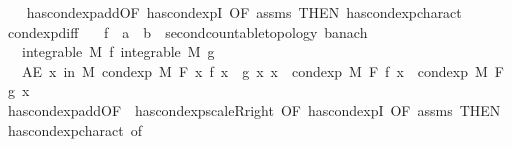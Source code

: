 \begin{isabellebody}
%
\isadelimproof
\ \ %
\endisadelimproof
%
\isatagproof
{}\isamarkupfalse%
\ has{\isacharunderscore}{\kern0pt}cond{\isacharunderscore}{\kern0pt}exp{\isacharunderscore}{\kern0pt}add{\isacharbrackleft}{\kern0pt}OF\ has{\isacharunderscore}{\kern0pt}cond{\isacharunderscore}{\kern0pt}expI{\isacharparenleft}{\kern0pt}{}{\isacharcomma}{\kern0pt}{}{\isacharparenright}{\kern0pt}{\isacharcomma}{\kern0pt}\ OF\ assms{\isacharcomma}{\kern0pt}\ THEN\ has{\isacharunderscore}{\kern0pt}cond{\isacharunderscore}{\kern0pt}exp{\isacharunderscore}{\kern0pt}charact{\isacharparenleft}{\kern0pt}{}{\isacharparenright}{\kern0pt}{\isacharbrackright}{\kern0pt}\ \isacommand{{\isachardot}{\kern0pt}}\isamarkupfalse%
%
\endisatagproof
{\isafoldproof}%
%
\isadelimproof
\isanewline
%
\endisadelimproof
\isanewline
{}\isamarkupfalse%
\ cond{\isacharunderscore}{\kern0pt}exp{\isacharunderscore}{\kern0pt}diff{\isacharcolon}{\kern0pt}\isanewline
\ \ \ f\ {\isacharcolon}{\kern0pt}{\isacharcolon}{\kern0pt}\ {\isachardoublequoteopen}{\isacharprime}{\kern0pt}a\ {\isasymRightarrow}\ {\isacharprime}{\kern0pt}b\ {\isacharcolon}{\kern0pt}{\isacharcolon}{\kern0pt}\ {\isacharbraceleft}{\kern0pt}second{\isacharunderscore}{\kern0pt}countable{\isacharunderscore}{\kern0pt}topology{\isacharcomma}{\kern0pt}\ banach{\isacharbraceright}{\kern0pt}{\isachardoublequoteclose}\isanewline
\ \ \ {\isachardoublequoteopen}integrable\ M\ f{\isachardoublequoteclose}\ {\isachardoublequoteopen}integrable\ M\ g{\isachardoublequoteclose}\isanewline
\ \ \ {\isachardoublequoteopen}AE\ x\ in\ M{\isachardot}{\kern0pt}\ cond{\isacharunderscore}{\kern0pt}exp\ M\ F\ {\isacharparenleft}{\kern0pt}{\isasymlambda}x{\isachardot}{\kern0pt}\ f\ x\ {\isacharminus}{\kern0pt}\ g\ x{\isacharparenright}{\kern0pt}\ x\ {\isacharequal}{\kern0pt}\ cond{\isacharunderscore}{\kern0pt}exp\ M\ F\ f\ x\ {\isacharminus}{\kern0pt}\ cond{\isacharunderscore}{\kern0pt}exp\ M\ F\ g\ x{\isachardoublequoteclose}\isanewline
%
\isadelimproof
\ \ %
\endisadelimproof
%
\isatagproof
{}\isamarkupfalse%
\ has{\isacharunderscore}{\kern0pt}cond{\isacharunderscore}{\kern0pt}exp{\isacharunderscore}{\kern0pt}add{\isacharbrackleft}{\kern0pt}OF\ {\isacharunderscore}{\kern0pt}\ has{\isacharunderscore}{\kern0pt}cond{\isacharunderscore}{\kern0pt}exp{\isacharunderscore}{\kern0pt}scaleR{\isacharunderscore}{\kern0pt}right{\isacharcomma}{\kern0pt}\ OF\ has{\isacharunderscore}{\kern0pt}cond{\isacharunderscore}{\kern0pt}expI{\isacharparenleft}{\kern0pt}{}{\isacharcomma}{\kern0pt}{}{\isacharparenright}{\kern0pt}{\isacharcomma}{\kern0pt}\ OF\ assms{\isacharcomma}{\kern0pt}\ THEN\ has{\isacharunderscore}{\kern0pt}cond{\isacharunderscore}{\kern0pt}exp{\isacharunderscore}{\kern0pt}charact{\isacharparenleft}{\kern0pt}{}{\isacharparenright}{\kern0pt}{\isacharcomma}{\kern0pt}\ of\ {\isachardoublequoteopen}{\isacharminus}{\kern0pt}{}{\isachardoublequoteclose}{\isacharbrackright}{\kern0pt}\ \isamarkupfalse%

\end{isabellebody}
